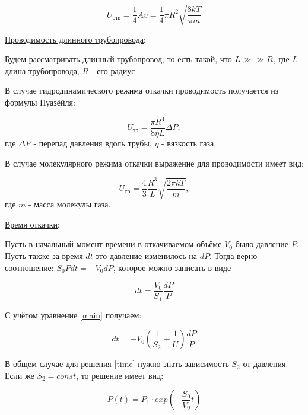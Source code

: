 \documentclass[15pt,a5paper,reqno]{article}
\begin{document}
    \begin{equation}
        U_{\text{отв}} = \frac{1}{4}Av = \frac{1}{4}\pi R^2 \sqrt{\frac{8kT}{\pi m}}
    \end{equation}
    
    \noindent\underline{Проводимость длинного трубопровода}:
    
    Будем рассматривать длинный трубопровод, то есть такой, что $L \gg\\\gg R $, где $L$ - длина трубопровода, $R$ - его радиус.
    
    В случае гидродинамического режима откачки проводимость получается из формулы Пуазёйля:
    
    \begin{equation}
        U_{\text{тр}} = \frac{\pi R^4}{8\eta L}\Delta P,
    \end{equation}
    где $\Delta P$ - перепад давления вдоль трубы, $\eta$ - вязкость газа.
    
    В случае молекулярного режима откачки выражение для проводимости имеет вид:
    
    \begin{equation}
        U_{\text{тр}} = \frac{4}{3}\frac{R^3}{L}\sqrt{\frac{2\pi kT}{m}},
    \end{equation}
    где $m$ - масса молекулы газа.
    
    \noindent\underline{Время откачки}:
    
    Пусть в начальный момент времени в откачиваемом объёме $V_0$ было давление $P$. Пусть также за время $dt$ это давление изменилось на $dP$. Тогда верно соотношение: $S_0Pdt = -V_0dP$, которое можно записать в виде
    
    \begin{equation}
        dt = \frac{V_0}{S_1}\frac{dP}{P}
    \end{equation}
    
    С учётом уравнение \eqref{main} получаем:
    
    \begin{equation}\label{time}
        dt = -V_0\left(\frac{1}{S_2} + \frac{1}{U}\right)\frac{dP}{P}
    \end{equation}
    
    В общем случае для решения \eqref{time} нужно знать зависимость $S_2$ от давления. Если же $S_2 = const$, то решение имеет вид:
    
    \begin{equation}
        P(t) = P_1\cdot exp\left(-\frac{S_0}{V_0}t\right)
    \end{equation}
    
\end{document}
